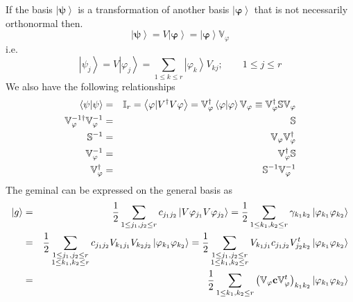 \documentclass[aps,preprint]{revtex4}
\begin{document}
If the basis $\left\vert \mathbf{\psi }\right\rangle $ is a transformation
of another basis $\left\vert \mathbf{\varphi }\right\rangle $ that is not
necessarily orthonormal then.%
\begin{equation}
\left\vert \mathbf{\psi }\right\rangle =V\left\vert \mathbf{\varphi }%
\right\rangle =\left\vert \mathbf{\varphi }\right\rangle \mathbb{V}_{\varphi
}
\end{equation}%
i.e. 
\begin{equation}
\left\vert \psi _{j}\right\rangle =V\left\vert \varphi _{j}\right\rangle
=\sum_{1\leq k\leq r}\left\vert \varphi _{k}\right\rangle V_{kj};\qquad
1\leq j\leq r
\end{equation}%
We also have the following relationships 
\begin{eqnarray}
\left\langle \mathbf{\psi }|\mathbf{\psi }\right\rangle &=&\mathbb{I}%
_{r}=\left\langle \mathbf{\varphi }|V^{\dagger }V\mathbf{\varphi }%
\right\rangle =\mathbb{V}_{\varphi }^{\dagger }\left\langle \mathbf{\varphi }%
|\mathbf{\varphi }\right\rangle \mathbb{V}_{\varphi }\equiv \mathbb{V}%
_{\varphi }^{\dagger }\mathbb{SV}_{\varphi }  \notag \\
\mathbb{V}_{\varphi }^{-1\dagger }\mathbb{V}_{\varphi }^{-1} &=&\mathbb{S} 
\notag \\
\mathbb{S}^{-1} &=&\mathbb{V}_{\varphi }\mathbb{V}_{\varphi }^{\dagger } 
\notag \\
\mathbb{V}_{\varphi }^{-1} &=&\mathbb{V}_{\varphi }^{\dagger }\mathbb{S} 
\notag \\
\mathbb{V}_{\varphi }^{\dagger } &=&\mathbb{S}^{-1}\mathbb{V}_{\varphi }^{-1}
\end{eqnarray}%
The geminal can be expressed on the general basis as 
\begin{eqnarray}
\left\vert g\right\rangle &=&\frac{1}{2}\sum_{1\leq j_{1},j_{2}\leq
r}c_{j_{1}j_{2}}\left\vert V\varphi _{j_{1}}V\varphi _{j_{2}}\right\rangle =%
\frac{1}{2}\sum_{1\leq k_{1},k_{2}\leq r}\gamma _{k_{1}k_{2}}\left\vert
\varphi _{k_{1}}\varphi _{k_{2}}\right\rangle  \notag \\
&=&\frac{1}{2}\sum_{\substack{ 1\leq j_{1},j_{2}\leq r  \\ 1\leq
k_{1},k_{2}\leq r}}c_{j_{1}j_{2}}V_{k_{1}j_{1}}V_{k_{2}j_{2}}\left\vert
\varphi _{k_{1}}\varphi _{k_{2}}\right\rangle =\frac{1}{2}\sum_{\substack{ %
1\leq j_{1},j_{2}\leq r  \\ 1\leq k_{1},k_{2}\leq r}}%
V_{k_{1}j_{1}}c_{j_{1}j_{2}}V_{j_{2}k_{2}}^{t}\left\vert \varphi
_{k_{1}}\varphi _{k_{2}}\right\rangle  \notag \\
&=&\frac{1}{2}\sum_{1\leq k_{1},k_{2}\leq r}\left( \mathbb{V}_{\varphi }%
\mathbf{c}\mathbb{V}_{\varphi }^{t}\right) _{k_{1}k_{2}}\left\vert \varphi
_{k_{1}}\varphi _{k_{2}}\right\rangle
\end{eqnarray}%
\end{document}
